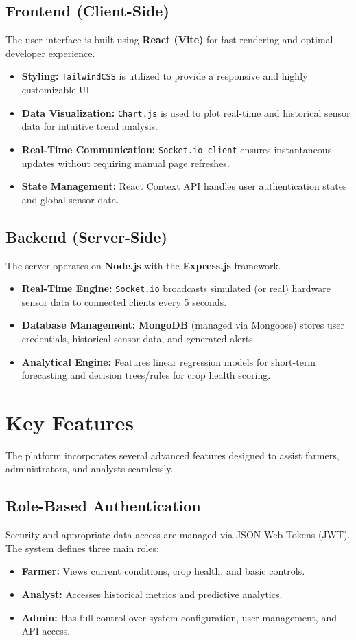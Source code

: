 \documentclass[12pt,a4paper]{article}
\begin{document}
\subsection{Frontend (Client-Side)}
The user interface is built using \textbf{React (Vite)} for fast rendering and optimal developer experience.
\begin{itemize}
    \item \textbf{Styling:} \texttt{TailwindCSS} is utilized to provide a responsive and highly customizable UI.
    \item \textbf{Data Visualization:} \texttt{Chart.js} is used to plot real-time and historical sensor data for intuitive trend analysis.
    \item \textbf{Real-Time Communication:} \texttt{Socket.io-client} ensures instantaneous updates without requiring manual page refreshes.
    \item \textbf{State Management:} React Context API handles user authentication states and global sensor data.
\end{itemize}

\subsection{Backend (Server-Side)}
The server operates on \textbf{Node.js} with the \textbf{Express.js} framework.
\begin{itemize}
    \item \textbf{Real-Time Engine:} \texttt{Socket.io} broadcasts simulated (or real) hardware sensor data to connected clients every 5 seconds.
    \item \textbf{Database Management:} \textbf{MongoDB} (managed via Mongoose) stores user credentials, historical sensor data, and generated alerts.
    \item \textbf{Analytical Engine:} Features linear regression models for short-term forecasting and decision trees/rules for crop health scoring.
\end{itemize}

\section{Key Features}

The platform incorporates several advanced features designed to assist farmers, administrators, and analysts seamlessly.

\subsection{Role-Based Authentication}
Security and appropriate data access are managed via JSON Web Tokens (JWT). The system defines three main roles:
\begin{itemize}
    \item \textbf{Farmer:} Views current conditions, crop health, and basic controls.
    \item \textbf{Analyst:} Accesses historical metrics and predictive analytics.
    \item \textbf{Admin:} Has full control over system configuration, user management, and API access.
\end{itemize}
\end{document}
